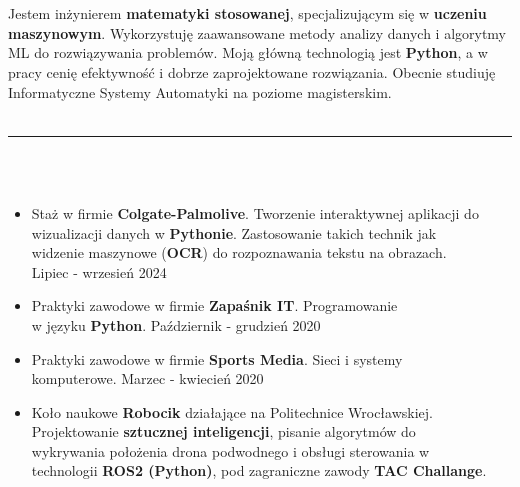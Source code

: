\documentclass[10pt]{article}
\begin{document}
\begin{paracol}{2}
\begin{rightcolumn}
    \vspace*{-2ex} %
    \noindent {}
    \fontsize{10pt}{10pt}
    \\ \\
    Jestem inżynierem \textbf{matematyki stosowanej}, specjalizującym się w \textbf{uczeniu maszynowym}. 
    Wykorzystuję zaawansowane metody analizy danych i algorytmy ML do rozwiązywania problemów. 
    Moją główną technologią jest \textbf{Python}, a w pracy cenię efektywność i dobrze zaprojektowane rozwiązania.
    Obecnie studiuję Informatyczne Systemy Automatyki na poziome magisterskim.
    \\ \\
    \rule{11cm}{1pt} \\ \\
    \fontsize{10pt}{10pt}
    \begin{itemize}[leftmargin=*]
        \setlength{\parskip}{0pt}
        \item Staż w firmie \textbf{Colgate-Palmolive}. Tworzenie interaktywnej aplikacji do
        wizualizacji danych w \textbf{Pythonie}. Zastosowanie takich technik jak \\
        widzenie maszynowe (\textbf{OCR}) do rozpoznawania tekstu na obrazach. \\
        Lipiec - wrzesień 2024
        \item Praktyki zawodowe w firmie \textbf{Zapaśnik IT}. Programowanie \\ 
        w języku \textbf{Python}. Październik - grudzień 2020
        \item Praktyki zawodowe w firmie \textbf{Sports Media}. Sieci i systemy \\
        komputerowe. Marzec - kwiecień 2020
        \item Koło naukowe \textbf{Robocik} działające na Politechnice Wrocławskiej. \\
        Projektowanie \textbf{sztucznej inteligencji}, pisanie algorytmów do \\
        wykrywania położenia drona podwodnego i obsługi sterowania w \\ technologii \textbf{ROS2 (Python)},
        pod zagraniczne zawody \textbf{TAC Challange}.

\end{itemize}
\end{rightcolumn}
\end{paracol}
\end{document}

